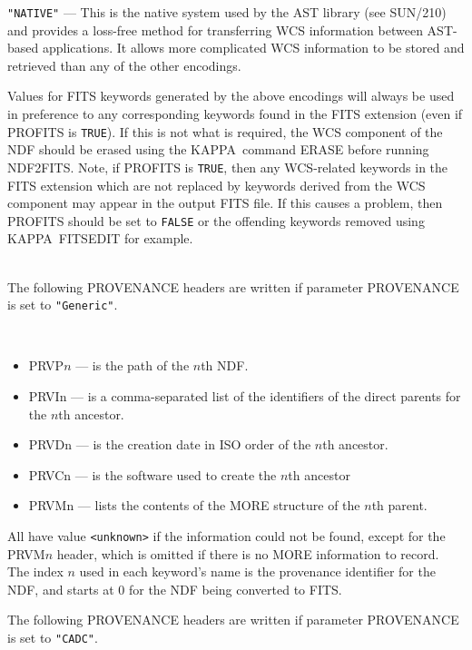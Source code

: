 \documentclass[twoside,11pt]{article}
\newcommand{\latex}[1]{#1}
\newcommand{\xref}[3]{#1}
\newcommand{\KAPPA}{{\footnotesize KAPPA}}
\newcommand{\sstdiytopic}[2]{\goodbreak \item[{\hspace{-0.35em}#1\hspace{-0.35em}:}] \mbox{} \\[1.3ex] #2}
\newcommand{\ssthitemlist}[1]{
  \latex{
  \mbox{} \\
  \vspace{-3.5ex}
  }
  \begin{itemize}
     #1
  \end{itemize}
}
\newcommand{\sstitem}{\item}
\newcommand{\sstdiytopic}[2]{\\ \item[{#1}:]
      \begin{description}
         #2
      \end{description}
   }
\newcommand{\sstitem}{\item}
\begin{document}
{{{         \sstitem
         \texttt{"NATIVE"} --- This is the native system used by the AST library (see
         SUN/210) and provides a loss-free method for transferring WCS
         information between AST-based applications.  It allows more
         complicated WCS information to be stored and retrieved than any of 
         the other encodings.
      }

      Values for FITS keywords generated by the above encodings will
      always be used in preference to any corresponding keywords found in
      the FITS extension (even if PROFITS is \texttt{TRUE}).
      If this is not what
      is required, the WCS component of the NDF should be erased using
      the \KAPPA\ command \xref{ERASE}{sun95}{ERASE} before running NDF2FITS. Note, if PROFITS
      is \texttt{TRUE}, then any WCS-related keywords in the FITS extension
      which are not replaced by keywords derived from the WCS component may
      appear in the output FITS file. If this causes a problem, then
      PROFITS should be set to \texttt{FALSE} or the offending keywords removed
      using \KAPPA\ 
      \xref{FITSEDIT}{sun95}{FITSEDIT}
      for example.
   }
   \sstdiytopic{
      \label{ndf2fits_provenance}Provenance
   }{
      The following PROVENANCE headers are written if parameter
      PROVENANCE is set to \texttt{"Generic"}.
      \ssthitemlist{

         \sstitem
         PRVP$n$ --- is the path of the $n$th NDF.

         \sstitem
         PRVIn --- is a comma-separated list of the identifiers of the 
           direct parents for the $n$th ancestor.

         \sstitem
         PRVDn --- is the creation date in ISO order of the $n$th ancestor.

         \sstitem
         PRVCn --- is the software used to create the $n$th ancestor
         
         \sstitem
         PRVMn --- lists the contents of the MORE structure of the $n$th
           parent.
      }
      All have value \texttt{<unknown>} if the information could not be found, 
      except for the PRVM$n$ header, which is omitted if there is no MORE 
      information to record.   The index $n$ used in each keyword's name 
      is the provenance identifier for the NDF, and starts at 0 for the
      NDF being converted to FITS.

      The following PROVENANCE headers are written if parameter
      PROVENANCE is set to \texttt{"CADC"}.
      \ssthitemlist{

}}}
\end{document}
